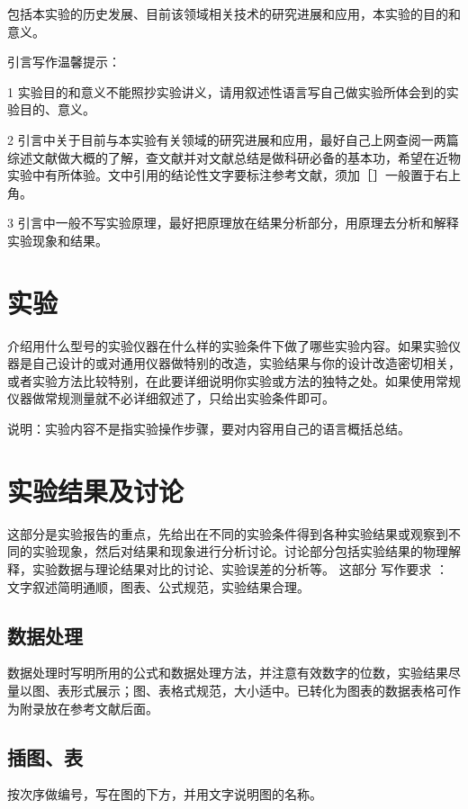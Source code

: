 \documentclass{leptc-exp}
\begin{document}
包括本实验的历史发展、目前该领域相关技术的研究进展和应用，本实验的目的和意义。

引言写作温馨提示：

1 实验目的和意义不能照抄实验讲义，请用叙述性语言写自己做实验所体会到的实验目的、意义。

2 引言中关于目前与本实验有关领域的研究进展和应用，最好自己上网查阅一两篇综述文献做大概的了解，查文献并对文献总结是做科研必备的基本功，希望在近物实验中有所体验。文中引用的结论性文字要标注参考文献，须加［］一般置于右上角。  

3 引言中一般不写实验原理，最好把原理放在结果分析部分，用原理去分析和解释实验现象和结果。


\section{实验}

介绍用什么型号的实验仪器在什么样的实验条件下做了哪些实验内容。如果实验仪器是自己设计的或对通用仪器做特别的改造，实验结果与你的设计改造密切相关，或者实验方法比较特别，在此要详细说明你实验或方法的独特之处。如果使用常规仪器做常规测量就不必详细叙述了，只给出实验条件即可。

说明：实验内容不是指实验操作步骤，要对内容用自己的语言概括总结。


\section{实验结果及讨论}

这部分是实验报告的重点，先给出在不同的实验条件得到各种实验结果或观察到不同的实验现象，然后对结果和现象进行分析讨论。讨论部分包括实验结果的物理解释，实验数据与理论结果对比的讨论、实验误差的分析等。
这部分
写作要求 ： 文字叙述简明通顺，图表、公式规范，实验结果合理。


\subsection{数据处理}

数据处理时写明所用的公式和数据处理方法，并注意有效数字的位数，实验结果尽量以图、表形式展示；图、表格式规范，大小适中。已转化为图表的数据表格可作为附录放在参考文献后面。


\subsection{插图、表}

按次序做编号，写在图的下方，并用文字说明图的名称。
\end{document}
